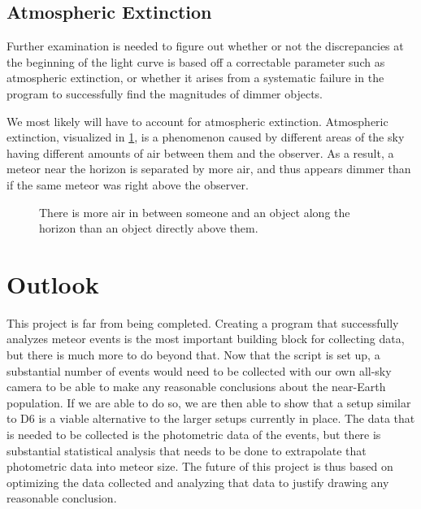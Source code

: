\subsection{Atmospheric Extinction}
Further examination is needed to figure out whether or not the discrepancies at the beginning of the light curve is based off a correctable parameter such as atmospheric extinction, or whether it arises from a systematic failure in the program to successfully find the magnitudes of dimmer objects.

We most likely will have to account for atmospheric extinction. Atmospheric extinction, visualized in \ref{fig:extinction}, is a phenomenon caused by different areas of the sky having different amounts of air between them and the observer. As a result, a meteor near the horizon is separated by more air, and thus appears dimmer than if the same meteor was right above the observer. 
\begin{figure}[ht!]
	\centering
	\caption{There is more air in between someone and an object along the horizon than an object directly above them.}
	\label{fig:extinction}
\end{figure}


\section{Outlook}
This project is far from being completed. Creating a program that successfully analyzes meteor events is the most important building block for collecting data, but there is much more to do beyond that. Now that the script is set up, a substantial number of events would need to be collected with our own all-sky camera to be able to make any reasonable conclusions about the near-Earth population. If we are able to do so, we are then able to show that a setup similar to D6 is a viable alternative to the larger setups currently in place.  The data that is needed to be collected is the photometric data of the events, but there is substantial statistical analysis that needs to be done to extrapolate that photometric data into meteor size. The future of this project is thus based on optimizing the data collected and analyzing that data to justify drawing any reasonable conclusion.
